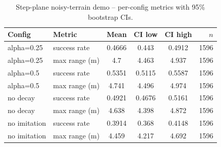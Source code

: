 \begin{table}[ht]
\centering
\caption{Step-plane noisy-terrain demo -- per-config metrics with 95\% bootstrap CIs.}
\label{tab:noisy}
\begin{tabular}{llcccr}
\toprule
Config & Metric & Mean & CI low & CI high & $n$ \\
\midrule
alpha=0.25 & success rate & 0.4666 & 0.443 & 0.4912 & 1596 \\
alpha=0.25 & max range (m) & 4.7 & 4.463 & 4.937 & 1596 \\
alpha=0.5 & success rate & 0.5351 & 0.5115 & 0.5587 & 1596 \\
alpha=0.5 & max range (m) & 4.741 & 4.496 & 4.974 & 1596 \\
no decay & success rate & 0.4921 & 0.4676 & 0.5161 & 1596 \\
no decay & max range (m) & 4.638 & 4.398 & 4.872 & 1596 \\
no imitation & success rate & 0.3914 & 0.368 & 0.4148 & 1596 \\
no imitation & max range (m) & 4.459 & 4.217 & 4.692 & 1596 \\
\bottomrule
\end{tabular}
\end{table}

